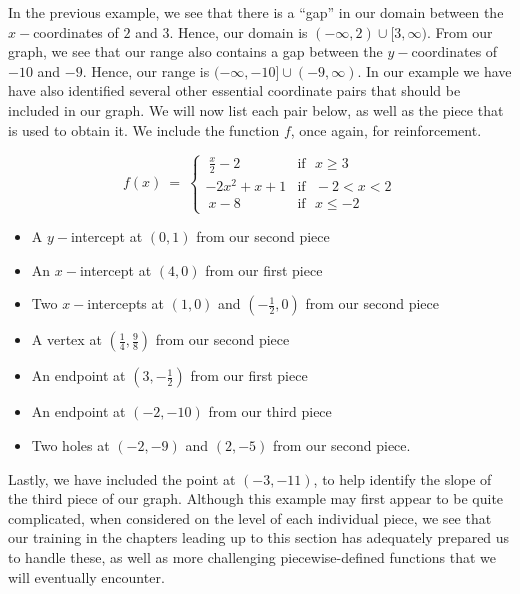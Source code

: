 In the previous example, we see that there is a ``gap'' in our domain between the $x-$coordinates of $2$ and $3$.  Hence, our domain is $(-\infty,2)\cup[3,\infty)$.  From our graph, we see that our range also contains a gap between the $y-$coordinates of $-10$ and $-9$.  Hence, our range is $(-\infty,-10]\cup(-9,\infty)$.
\newpage
In our example we have have also identified several other essential coordinate pairs that should be included in our graph.  We will now list each pair below, as well as the piece that is used to obtain it.  We include the function $f$, once again, for reinforcement.
\begin{center}
\[ f(x)~=~
	\begin{cases} 
      ~\frac{x}{2}-2 & \text{if~~} x\geq 3\\
			-2x^2+x+1 & \text{if~~} -2<x<2\\
			~x-8 & \text{if~~} x\leq -2
  \end{cases}
\]
\end{center}
\begin{itemize}
\item A $y-$intercept at $(0,1)$ from our second piece
\item An $x-$intercept at $(4,0)$ from our first piece
\item Two $x-$intercepts at $(1,0)$ and $\left(-\frac{1}{2},0\right)$ from our second piece
\item A vertex at $\left(\frac{1}{4},\frac{9}{8}\right)$ from our second piece
\item An endpoint at $\left(3,-\frac{1}{2}\right)$ from our first piece
\item An endpoint at $(-2,-10)$ from our third piece
\item Two holes at $(-2,-9)$ and $(2,-5)$ from our second piece.
\end{itemize}
Lastly, we have included the point at $(-3,-11)$, to help identify the slope of the third piece of our graph.\pp
Although this example may first appear to be quite complicated, when considered on the level of each individual piece, we see that our training in the chapters leading up to this section has adequately prepared us to handle these, as well as more challenging piecewise-defined functions that we will eventually encounter.